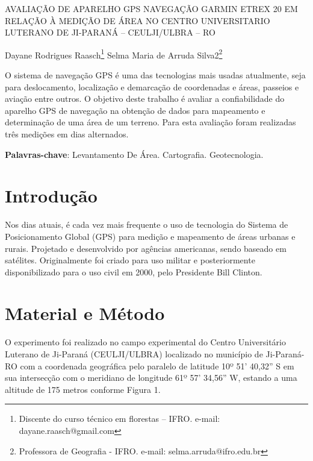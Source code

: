 \documentclass[article,12pt,onesidea,4paper,english,brazil]{abntex2}
\begin{document}
	
	\frenchspacing 
	
	\begin{center}
		\LARGE 
		AVALIAÇÃO DE APARELHO GPS NAVEGAÇÃO GARMIN ETREX 20 EM RELAÇÃO À MEDIÇÃO DE ÁREA NO CENTRO UNIVERSITARIO LUTERANO DE JI-PARANÁ – CEULJI/ULBRA – RO
		
		\normalsize
		Dayane Rodrigues Raasch\footnote{Discente do curso técnico em florestas – IFRO. e-mail: dayane.raasch@gmail.com} 
		Selma Maria de Arruda Silva2\footnote{Professora de Geografia - IFRO. e-mail: selma.arruda@ifro.edu.br} 
	 
	\end{center}
	
	\begin{resumoumacoluna}
O sistema de navegação GPS é uma das tecnologias mais usadas atualmente, seja para deslocamento, localização e demarcação de coordenadas e áreas, passeios e aviação entre outros. O objetivo deste trabalho é avaliar a confiabilidade do aparelho GPS de navegação na obtenção de dados para mapeamento e determinação de uma área de um terreno. Para esta avaliação foram realizadas três medições em dias alternados.
		
		\vspace{\onelineskip}
		
		\noindent
		\textbf{Palavras-chave}: Levantamento De Área. Cartografia. Geotecnologia.
	\end{resumoumacoluna}
	
	\textual
	
	\section*{Introdução}
	
	Nos dias atuais, é cada vez mais frequente o uso de tecnologia do Sistema de Posicionamento Global (GPS) para medição e mapeamento de áreas urbanas e rurais. Projetado e desenvolvido por agências americanas, sendo baseado em satélites. Originalmente foi criado para uso militar e posteriormente disponibilizado para o uso civil em 2000, pelo Presidente Bill Clinton.
	
	\section*{Material e Método}
	
O experimento foi realizado no campo experimental do Centro Universitário Luterano de Ji-Paraná (CEULJI/ULBRA) localizado no município de Ji-Paraná-RO com a coordenada geográfica pelo paralelo de latitude 10º 51’ 40,32” S em sua intersecção com o meridiano de longitude 61º 57’ 34,56” W, estando a uma altitude de 175 metros conforme Figura 1.
\end{document}
